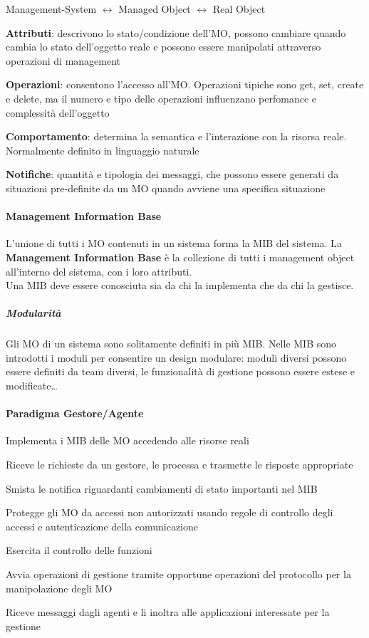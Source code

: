 \documentclass[10pt]{book}
\begin{document}
\begin{center}
Management-System $\leftrightarrow$ Managed Object $\leftrightarrow$ Real Object
\end{center}
\begin{list}{}{\textbf{Caratteristiche}}
	\item \textbf{Attributi}: descrivono lo stato/condizione dell'MO, possono cambiare quando cambia lo stato dell'oggetto reale e possono essere manipolati attraverso operazioni di management
	\item \textbf{Operazioni}: consentono l'accesso all'MO. Operazioni tipiche sono get, set, create e delete, ma il numero e tipo delle operazioni influenzano perfomance e complessità dell'oggetto
	\item \textbf{Comportamento}: determina la semantica e l'interazione con la risorsa reale. Normalmente definito in linguaggio naturale
	\item \textbf{Notifiche}: quantità e tipologia dei messaggi, che possono essere generati da situazioni pre-definite da un MO quando avviene una specifica situazione
\end{list}
\paragraph{Management Information Base} L'unione di tutti i MO contenuti in un sistema forma la MIB del sistema. La \textbf{Management Information Base} è la collezione di tutti i management object all'interno del sistema, con i loro attributi.\\
Una MIB deve essere conosciuta sia da chi la implementa che da chi la gestisce.
\subparagraph{Modularità} Gli MO di un sistema sono solitamente definiti in più MIB. Nelle MIB sono introdotti i moduli per consentire un design modulare: moduli diversi possono essere definiti da team diversi, le funzionalità di gestione possono essere estese e modificate\ldots
\paragraph{Paradigma Gestore/Agente}
\begin{list}{}{Agent}
	\item Implementa i MIB delle MO accedendo alle risorse reali
	\item Riceve le richieste da un gestore, le processa e trasmette le risposte appropriate
	\item Smista le notifica riguardanti cambiamenti di stato importanti nel MIB
	\item Protegge gli MO da accessi non autorizzati usando regole di controllo degli accessi e autenticazione della comunicazione
\end{list}
\begin{list}{}{Manager}
	\item Esercita il controllo delle funzioni
	\item Avvia operazioni di gestione tramite opportune operazioni del protocollo per la manipolazione degli MO
	\item Riceve messaggi dagli agenti e li inoltra alle applicazioni interessate per la gestione
\end{list}
\end{document}
